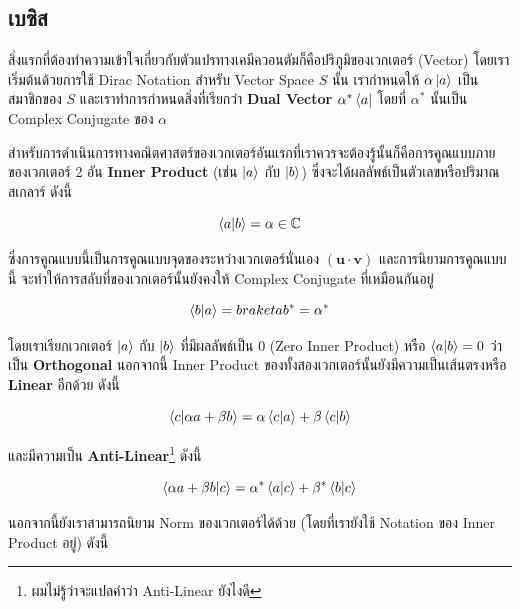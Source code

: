 \subsection{เบซิส}

สิ่งแรกที่ต้องทำความเข้าใจเกี่ยวกับตัวแปรทางเคมีควอนตัมก็คือปริภูมิของเวกเตอร์ (Vector) โดยเราเริ่มต้นด้วยการใช้ Dirac Notation
สำหรับ Vector Space $S$ นั้น เรากำหนดให้ $\alpha \ket{a}$ เป็นสมาชิกของ $S$ และเราทำการกำหนดสิ่งที่เรียกว่า \textbf{Dual
    Vector} $\alpha^* \bra{a}$ โดยที่ $\alpha^*$ นั้นเป็น Complex Conjugate ของ $\alpha$

สำหรับการดำเนินการทางคณิตศาสตร์ของเวกเตอร์อันแรกที่เราควรจะต้องรู้นั้นก็คือการคูณแบบภายของเวกเตอร์ 2 อัน \textbf{Inner Product}
(เช่น $\ket{a}$ กับ $\ket{b}$) ซึ่งจะได้ผลลัพธ์เป็นตัวเลขหรือปริมาณสเกลาร์ ดังนี้

\begin{equation}
    \braket{a}{b}
    =
    \alpha \in \mathbb{C}
\end{equation}

\noindent ซึ่งการคูณแบบนี้เป็นการคูณแบบจุดของระหว่างเวกเตอร์นั่นเอง $(\bm{u} \cdot \bm{v})$ และการนิยามการคูณแบบนี้%
จะทำให้การสลับที่ของเวกเตอร์นั้นยังคงให้ Complex Conjugate ที่เหมือนกันอยู่

\begin{equation}
    \label{eq:braket_conjugate}
    \braket{b}{a}
    =
    braket{a}{b}^*
    = \alpha^*
\end{equation}

\noindent โดยเราเรียกเวกเตอร์ $\ket{a}$ กับ $\ket{b}$ ที่มีผลลัพธ์เป็น 0 (Zero Inner Product) หรือ $ \braket{a}{b} = 0$
ว่าเป็น \textbf{Orthogonal} นอกจากนี้ Inner Product ของทั้งสองเวกเตอร์นั้นยังมีความเป็นเส้นตรงหรือ \textbf{Linear} อีกด้วย ดังนี้

\begin{equation}
    \braket{c}{\alpha a + \beta b}
    =
    \alpha \braket{c}{a} + \beta \braket{c}{b}
\end{equation}

\noindent และมีความเป็น \textbf{Anti-Linear}\footnote{ผมไม่รู้ว่าจะแปลคำว่า Anti-Linear ยังไงดี} ดังนี้

\begin{equation}
    \braket{\alpha a + \beta b}{c}
    =
    \alpha^* \braket{a}{c} + \beta^* \braket{b}{c}
\end{equation}

นอกจากนี้ยังเราสามารถนิยาม Norm ของเวกเตอร์ได้ด้วย (โดยที่เรายังใช้ Notation ของ Inner Product อยู่) ดังนี้

